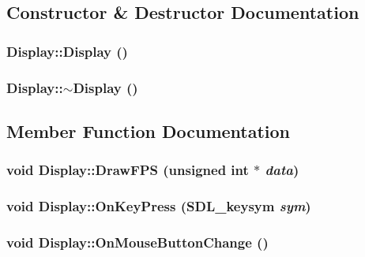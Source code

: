\subsection{Constructor \& Destructor Documentation}
\hypertarget{class_display_e972fffea6f7ca1d627ef48c3d841bb3}{
\subsubsection[{Display}]{\setlength{\rightskip}{0pt plus 5cm}Display::Display ()}}
\label{class_display_e972fffea6f7ca1d627ef48c3d841bb3}


\hypertarget{class_display_c2607a6bb236c55547a4223d40d85d1f}{
\subsubsection[{$\sim$Display}]{\setlength{\rightskip}{0pt plus 5cm}Display::$\sim$Display ()}}
\label{class_display_c2607a6bb236c55547a4223d40d85d1f}




\subsection{Member Function Documentation}
\hypertarget{class_display_8881e9219d6d46ae604dcaf295a3e5bf}{
\subsubsection[{DrawFPS}]{\setlength{\rightskip}{0pt plus 5cm}void Display::DrawFPS (unsigned int $\ast$ {\em data})}}
\label{class_display_8881e9219d6d46ae604dcaf295a3e5bf}


\hypertarget{class_display_58339797d54888001d3d416467a3d530}{
\subsubsection[{OnKeyPress}]{\setlength{\rightskip}{0pt plus 5cm}void Display::OnKeyPress (SDL\_\-keysym {\em sym})}}
\label{class_display_58339797d54888001d3d416467a3d530}


\hypertarget{class_display_29dfadd3a0a9c693df9ec49a94cd0b39}{
\subsubsection[{OnMouseButtonChange}]{\setlength{\rightskip}{0pt plus 5cm}void Display::OnMouseButtonChange ()}}
\label{class_display_29dfadd3a0a9c693df9ec49a94cd0b39}


